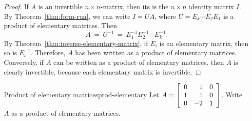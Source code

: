 \documentclass{ximera}
\begin{document}
\begin{proof}
  If $A$ is an invertible $n\times n$-matrix, then its {\rref} is the
  $n\times n$ identity matrix $I$. By Theorem~\ref{thm:form-rua}, we
  can write $I=UA$, where $U = E_k\cdots E_2E_1$ is a product of
  elementary matrices. Then
  \begin{equation*}
    A ~=~ U^{-1} ~=~ E_1^{-1}E_2^{-1}\cdots E_k^{-1}.
  \end{equation*}
  By Theorem~\ref{thm:inverse-elementary-matrix}, if $E_i$ is an
  elementary matrix, then so is $E_i^{-1}$. Therefore, $A$ has been
  written as a product of elementary matrices. Conversely, if $A$ can
  be written as a product of elementary matrices, then $A$ is clearly
  invertible, because each elementary matrix is invertible.
\end{proof}

\begin{example}{Product of elementary matrices}{prod-elementary}
  Let $A = \startmat{rrr}
    0 &  1 & 0 \\
    1 &  1 & 0 \\
    0 & -2 & 1
  \stopmat$.
  Write $A$ as a product of elementary matrices.
\end{example}
\end{document}
